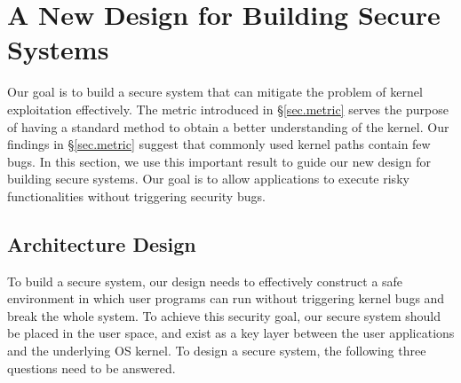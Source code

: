 \section{A New Design for Building Secure Systems}
\label{sec.design}



Our goal is to build a secure system that can mitigate the problem of kernel exploitation effectively. 
The metric introduced in \S{\ref{sec.metric}} serves the purpose of having a standard method to 
obtain a better understanding of the kernel. %
Our findings in \S{\ref{sec.metric}} suggest that commonly used kernel paths contain few bugs.
In this section, we use this important result to guide our new design for building secure systems. 
Our goal is to allow applications to execute risky functionalities without triggering security bugs.

\subsection{Architecture Design}
To build a secure system, our design needs to effectively construct a safe environment in which user programs 
can run without triggering kernel bugs and break the whole system. 
To achieve this security goal, 
our secure system should be placed in the user space, and exist as a key layer between the user applications 
and the underlying OS kernel. To design a secure system, the following three 
questions need to be answered. 

